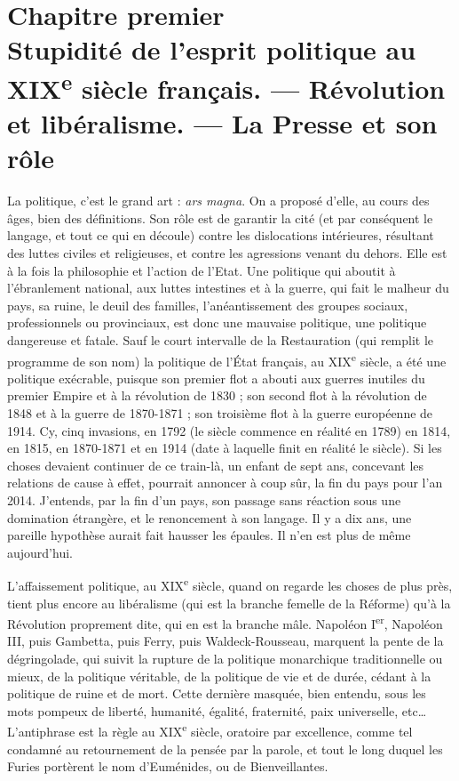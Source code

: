 \documentclass[french,twoside]{book} %
\newcommand\chapteropen{} %
\newcommand\chaptercont{} %
\renewcommand\chapteropen{} %
\renewcommand\chaptercont{} %
\begin{document}
\chapteropen
\chapter[Chapitre premier. Stupidité de l’esprit politique au XIXe siècle français. — Révolution et libéralisme. — La Presse et son rôle]{Chapitre premier{\hskip1pt}\\{}Stupidité de l’esprit politique au XIX\textsuperscript{e} siècle français. — Révolution et libéralisme. — La Presse et son rôle}

\chaptercont
\noindent La politique, c’est le grand art : {\itshape ars magna}. On a proposé d’elle, au cours des âges, bien des définitions. Son rôle est de garantir la cité (et par conséquent le langage, et tout ce qui en découle) contre les dislocations intérieures, résultant des luttes civiles et religieuses, et contre les agressions venant du dehors. Elle est à la fois la philosophie et l’action de l’Etat. Une politique qui aboutit à l’ébranlement national, aux luttes intestines et à la guerre, qui fait le malheur du pays, sa ruine, le deuil des familles, l’anéantissement des groupes sociaux, professionnels ou provinciaux, est donc une mauvaise politique, une politique dangereuse et fatale. Sauf le court intervalle de la Restauration (qui remplit le programme de son nom) la politique de l’État français, au XIX\textsuperscript{e} siècle, a été une politique exécrable, puisque son premier flot a abouti aux guerres inutiles du premier Empire et à la révolution de 1830 ; son second flot à la révolution de 1848 et à la guerre de 1870-1871 ; son troisième flot à la guerre européenne de 1914. Cy, cinq invasions, en 1792 (le siècle commence en réalité en 1789) en 1814, en 1815, en 1870-1871 et en 1914 (date à laquelle finit en réalité le siècle). Si les choses devaient continuer de ce train-là, un enfant de sept ans, concevant les relations de cause à effet, pourrait annoncer à coup sûr, la fin du pays pour l’an 2014. J’entends, par la fin d’un pays, son passage sans réaction sous une domination étrangère, et le renoncement à son langage. Il y a dix ans, une pareille hypothèse aurait fait hausser les épaules. Il n’en est plus de même aujourd’hui.\par
L’affaissement politique, au XIX\textsuperscript{e} siècle, quand on regarde les choses de plus près, tient plus encore au libéralisme (qui est la branche femelle de la Réforme) qu’à la Révolution proprement dite, qui en est la branche mâle. Napoléon I\textsuperscript{er}, Napoléon III, puis Gambetta, puis Ferry, puis Waldeck-Rousseau, marquent la pente de la dégringolade, qui suivit la rupture de la politique monarchique traditionnelle ou mieux, de la politique véritable, de la politique de vie et de durée, cédant à la politique de ruine et de mort. Cette dernière masquée, bien entendu, sous les mots pompeux de liberté, humanité, égalité, fraternité, paix universelle, etc… L’antiphrase est la règle au XIX\textsuperscript{e} siècle, oratoire par excellence, comme tel condamné au retournement de la pensée par la parole, et tout le long duquel les Furies portèrent le nom d’Euménides, ou de Bienveillantes.\par
\end{document}
